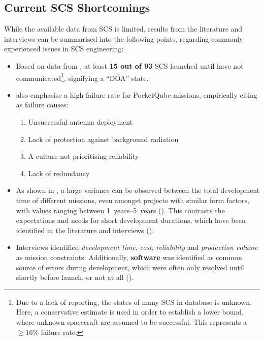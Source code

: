 \documentclass[a4paper,nobib,justified,final]{tufte-book}
\begin{document}
\subsection[Current SCS Shortcomings]{Current \acs{SCS} Shortcomings}
\label{sec:LITERATURE_shortcomings}
While the available data from \acs{SCS} is limited, results from the literature and interviews can be summarised into the following points, regarding commonly experienced issues in \acl{SCS} engineering:
\begin{itemize}[itemsep=-1ex]
	\item Based on data from \autocite{kuluNanosatsDatabase2023}, at least \textbf{15 out of 93} \acs{SCS} launched until \citeyear{kuluNanosatsDatabase2023} have not communicated\footnote{Due to a lack of reporting, the states of many \acs{SCS} in \citeauthor{kuluNanosatsDatabase2023} database is unknown. Here, a conservative estimate is used in order to establish a lower bound, where unknown spacecraft are assumed to be successful. This represents a \(\geq 16\%\) failure rate.}, signifying a ``\acl{DOA}'' state.
	\item \citeauthor{hermanExperimentalResultsModular2025} also emphasise a high failure rate for PocketQube missions, empirically citing as failure causes: \autocite{hermanExperimentalResultsModular2025}
	\begin{enumerate}[itemsep=-3ex]
		\item Unsuccessful antenna deployment
		\item Lack of protection against background radiation
		\item A culture not prioritising reliability
		\item Lack of redundancy
	\end{enumerate}
	\item As shown in , a large variance can be observed between the total development time of different missions, even amongst projects with similar form factors, with values ranging between \qtyrange[range-units = single]{1}{5}{years} (). This contrasts the expectations and needs for short development durations, which have been identified in the literature \autocite{heinAttoSatsChipSatsOther2019,pradhanShorteningDeliveryTime2020,uludagDelfiPQInOrbitPerformance2025} and interviews ().
	\item Interviews identified \emph{development time}, \emph{cost}, \emph{reliability} and \emph{production volume} as mission constraints. Additionally, \textbf{software} was identified as common source of errors during development, which were often only resolved until shortly before launch, or not at all ().

\end{itemize}
\end{document}
